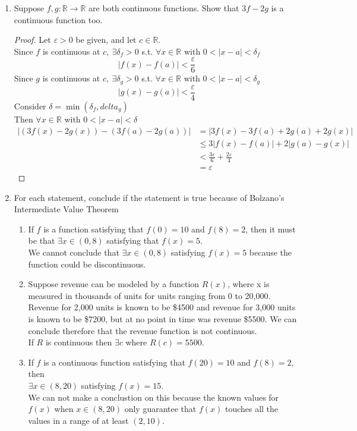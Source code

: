 \documentclass[12pt]{article}
\begin{document}
\begin{enumerate}
    \item Suppose $f,g: \mathbb{R} \to \mathbb{R}$ are both continuous functions. Show that $3f -2g$ is a continuous 
    function too.
    \begin{proof}
        Let $\varepsilon > 0$ be given, and let $c \in \mathbb{R}$. \\
        Since $f$ is continuous at $c, \ \exists \delta_f >0$ s.t. $\forall x \in \mathbb{R}$ with $0 < |x-a| < \delta_f$ 
        \[\big|f(x) - f(a)\big| < \frac{\varepsilon}{6}\]
        Since $g$ is continuous at $c, \ \exists \delta_g >0$ s.t. $\forall x \in \mathbb{R}$ with $0 < |x-a| < \delta_g$ 
        \[\big|g(x) - g(a)\big| < \frac{\varepsilon}{4}\]
        Consider $\delta = \min(\delta_f, delta_g)$ \\
        Then $\forall x \in \mathbb{R}$ with $0 < |x-a| < \delta$
        \begin{align*}
            \big|(3f(x)-2g(x)) - (3f(a)-2g(a))\big| &= \big| 3f(x)-3f(a) + 2g(a)+2g(x) \big| \\
            &\leq 3|f(x) - f(a)| + 2|g(a) - g(x)| \\
            &< \frac{3\varepsilon}{6} + \frac{2\varepsilon}{4} \\
            &= \varepsilon 
        \end{align*}
    \end{proof}

    \item For each statement, conclude if the statement is true because of Bolzano's Intermediate 
    Value Theorem
    \begin{enumerate}
        \item If $f$ is a function satisfying that $f(0) = 10$ and $f(8) = 2$, then it must be that 
        $\exists x \in (0, 8)$ satisfying that $f(x) = 5$. \\
        We cannot conclude that $\exists x \in (0,8)$ satisfying $f(x) = 5$ because the function could be discontinuous.

        \item Suppose revenue can be modeled by a function $R(x)$, where x is measured in 
        thousands of units for units ranging from 0 to 20,000. Revenue for 2,000 units is 
        known to be \$4500 and revenue for 3,000 units is known to be \$7200, but at no 
        point in time was revenue \$5500. We can conclude therefore that the revenue 
        function is not continuous. \\
        If $R$ is continuous then $\exists c$ where $R(c) = 5500$.

        \item If $f$ is a continuous function satisfying that $f(20) = 10$ and $f(8) = 2$, then \\ 
        $\exists x \in (8, 20)$ satisfying $f(x) = 15$. \\
        We can not make a conclustion on this because the known values for $f(x)$ when 
        $x \in (8, 20)$ only guarantee that $f(x)$ touches all the values in a range of at least 
        $(2, 10)$.
    \end{enumerate}
\end{enumerate}
\end{document}
